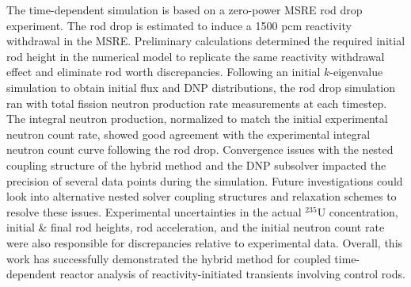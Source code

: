 The time-dependent simulation is based on a zero-power \gls{MSRE} rod drop experiment. The
rod drop is estimated to induce a 1500 pcm reactivity withdrawal in the \gls{MSRE}. Preliminary
calculations determined the required initial rod height in the numerical model to replicate the
same reactivity withdrawal effect and eliminate rod worth discrepancies. Following an initial
$k$-eigenvalue simulation to obtain initial flux and \gls{DNP} distributions, the rod drop
simulation ran with total fission neutron production rate measurements at each timestep. The
integral neutron production, normalized to match the initial experimental neutron count rate,
showed good agreement with the experimental integral neutron count curve following the rod drop.
Convergence issues with the nested coupling structure of the hybrid method and the \gls{DNP}
subsolver impacted the precision of several data points during the simulation.
Future investigations could look into alternative nested solver coupling structures and relaxation
schemes to resolve these issues.
Experimental uncertainties in the actual $^{235}$U concentration, initial \& final rod heights, rod
acceleration, and the initial neutron count rate were also responsible for discrepancies relative
to experimental data.
Overall, this work has successfully demonstrated the hybrid method for coupled time-dependent
reactor analysis of reactivity-initiated transients involving control rods.
